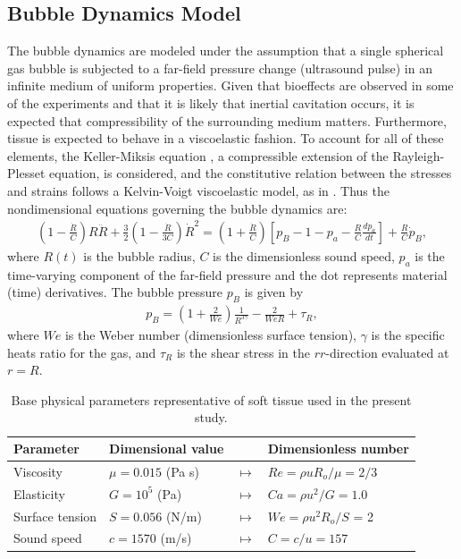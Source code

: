 \subsection{Bubble Dynamics Model}%
\label{subsec:usbe_bubble_model}%
The bubble dynamics are modeled under the assumption that a single
spherical gas bubble is subjected to a far-field pressure change
(ultrasound pulse) in an infinite medium of uniform properties.  Given
that bioeffects are observed in some of the experiments and that it is
likely that inertial cavitation occurs, it is expected that
compressibility of the surrounding medium matters. Furthermore, tissue
is expected to behave in a viscoelastic fashion. To account for all of
these elements, the Keller-Miksis equation \cite[]{Keller1980}, a
compressible extension of the Rayleigh-Plesset equation, is
considered, and the constitutive relation between the stresses and
strains follows a Kelvin-Voigt viscoelastic model, as in
\cite{Yang2005}. Thus the nondimensional equations governing the
bubble dynamics are:
\begin{eqnarray}\label{eq:keller}
  \left(1-\frac{\dot{R}}{C}\right) R \ddot{R} +
    \frac{3}{2}\left(1-\frac{\dot{R}}{3 C}\right) \dot{R}^2%
     = \left(1+\frac{\dot{R}}{C}\right) \left[p_B- 1 -p_a -
    \frac{R}{C}\frac{dp_a}{dt}\right] +\frac{R}{C} \dot{p}_B,
\end{eqnarray}
where $R(t)$ is the bubble radius, $C$ is the dimensionless sound
speed, $p_a$ is the time-varying component of the far-field pressure
and the dot represents material (time) derivatives. The bubble
pressure $p_B$ is given by
\begin{align}\label{eq:bubble_pressure}
  p_B = \left(1+\frac{2}{We}\right)\frac{1}{R^{3\gamma}}-\frac{2}{We R} + \tau_R,
\end{align}
where $We$ is the Weber number (dimensionless surface tension),
$\gamma$ is the specific heats ratio for the gas, and $\tau_R$ is the
shear stress in the $rr$-direction evaluated at $r=R$.

\begin{table}[!t]
  \centering
  \begin{tabular}{l l c l}
    Parameter & Dimensional value & & Dimensionless number \\ \hline
    Viscosity & $\mu=0.015$ (Pa s) & $\mapsto$ & $Re=\rho u R_o / \mu = 2/3$ \\
    Elasticity & $G=10^5$ (Pa) & $\mapsto$ & $Ca= \rho u^2 / G = 1.0$ 	\\
    Surface tension & $S=0.056$ (N/m) & $\mapsto$ & $We=\rho u^2 R_o / S$ = 2 \\
    Sound speed & $c=1570$ (m/s) & $\mapsto$ & $C = c/u=157$ \\  
  \end{tabular} 
  \caption{Base physical parameters representative of soft tissue used
    in the present study.}
  \label{tab:usbe_bubble_parameters}
\end{table}



